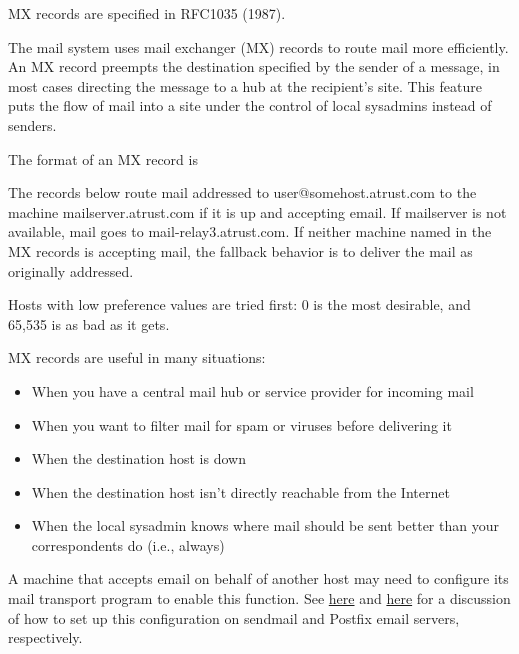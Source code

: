 \leavevmode\hypertarget{part0024_split_027.htmlux5cux23_idContainer953}{}%
MX records are specified in RFC1035 (1987).

\protect\hypertarget{part0024_split_027.htmlux5cux23_idIndexMarker2094}{}{}\protect\hypertarget{part0024_split_027.htmlux5cux23_idIndexMarker2095}{}{}The
mail system uses mail exchanger (MX) records to route mail more
efficiently. An MX record preempts the destination specified by the
sender of a message, in most cases directing the message to a hub at the
recipient's site. This feature puts the flow of mail into a site under
the control of local sysadmins instead of senders.

The format of an MX record is


The records below route mail addressed to user@somehost.atrust.com to
the machine mailserver.atrust.com if it is up and accepting email. If
mailserver is not available, mail goes to mail-relay3.atrust.com. If
neither machine named in the MX records is accepting mail, the fallback
behavior is to deliver the mail as originally addressed.


Hosts with low preference values are tried first: 0 is the most
desirable, and 65,535 is as bad as it gets.

MX records are useful in many situations:

\begin{itemize}
\item
  When you have a central mail hub or service provider for incoming mail
\item
  When you want to filter mail for spam or viruses before delivering it
\item
  When the destination host is down
\item
  When the destination host isn't directly reachable from the Internet
\item
  When the local sysadmin knows where mail should be sent better than
  your correspondents do (i.e., always)
\end{itemize}

A machine that accepts email on behalf of another host may need to
configure its mail transport program to enable this function. See
\protect\hyperlink{part0026_split_034.htmlux5cux23_idTextAnchor1073}{here}
and
\protect\hyperlink{part0026_split_062.htmlux5cux23_idTextAnchor1183}{here}
for a discussion of how to set up this configuration on {sendmail} and
Postfix email servers, respectively.

